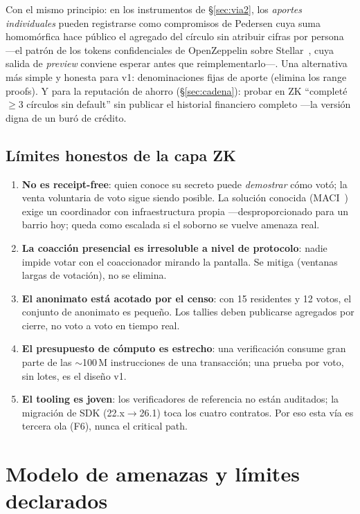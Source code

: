 \documentclass[twocolumn,10pt]{article}
\begin{document}
Con el mismo principio: en los instrumentos de \S\ref{sec:via2}, los \emph{aportes individuales} pueden registrarse como compromisos de Pedersen cuya suma homom\'orfica hace p\'ublico el agregado del c\'irculo sin atribuir cifras por persona ---el patr\'on de los tokens confidenciales de OpenZeppelin sobre Stellar~\cite{conftok}, cuya salida de \emph{preview} conviene esperar antes que reimplementarlo---. Una alternativa m\'as simple y honesta para v1: denominaciones fijas de aporte (elimina los range proofs). Y para la reputaci\'on de ahorro (\S\ref{sec:cadena}): probar en ZK ``complet\'e $\geq$3 c\'irculos sin default'' sin publicar el historial financiero completo ---la versi\'on digna de un bur\'o de cr\'edito.

\subsection{L\'imites honestos de la capa ZK}
\label{sec:zklimites}

\begin{enumerate}
\item \textbf{No es receipt-free}: quien conoce su secreto puede \emph{demostrar} c\'omo vot\'o; la venta voluntaria de voto sigue siendo posible. La soluci\'on conocida (MACI~\cite{maci}) exige un coordinador con infraestructura propia ---desproporcionado para un barrio hoy; queda como escalada si el soborno se vuelve amenaza real.
\item \textbf{La coacci\'on presencial es irresoluble a nivel de protocolo}: nadie impide votar con el coaccionador mirando la pantalla. Se mitiga (ventanas largas de votaci\'on), no se elimina.
\item \textbf{El anonimato est\'a acotado por el censo}: con 15 residentes y 12 votos, el conjunto de anonimato es peque\~no. Los tallies deben publicarse agregados por cierre, no voto a voto en tiempo real.
\item \textbf{El presupuesto de c\'omputo es estrecho}: una verificaci\'on consume gran parte de las $\sim$100\,M instrucciones de una transacci\'on; una prueba por voto, sin lotes, es el dise\~no v1.
\item \textbf{El tooling es joven}: los verificadores de referencia no est\'an auditados; la migraci\'on de SDK (22.x$\to$26.1) toca los cuatro contratos. Por eso esta v\'ia es tercera ola (F6), nunca el critical path.
\end{enumerate}

\section{Modelo de amenazas y l\'imites declarados}
\label{sec:amenazas}
\end{document}
